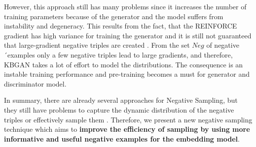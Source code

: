 However, this approach still has many problems since it increases the number of training parameters because of the generator and the model suffers from instability and degeneracy.
This results from the fact, that the  \textsc{REINFORCE} gradient has high variance for training the generator and it is still not guaranteed that large-gradient negative triples are created \cite{zhang2021efficient}.
From the set $Neg$ of negative´examples only a few negative triples lead to large gradients, and therefore, \ac{KBGAN} takes a lot of effort to model the distributions.
The consequence is an instable training performance and pre-training becomes a must for generator and discriminator model.
    
In summary, there are already several approaches for Negative Sampling, but they still have problems to capture the dynamic distribution of the negative triples or effectively sample them \cite{zhang2021efficient}.
Therefore, we present a new negative sampling technique which aims to \textbf{improve the efficiency of sampling by using more informative and useful negative examples for the embedding model}.



